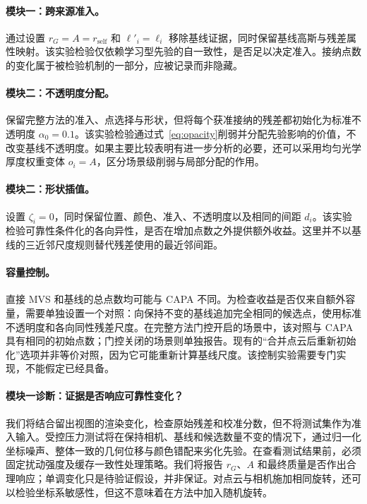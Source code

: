 \documentclass{article}
\newcommand{\ours}{CAPA}
\newcommand{\rself}{r_{\mathrm{self}}}
\begin{document}
\paragraph{模块一：跨来源准入。}
通过设置 $r_G=A=\rself$ 和 $\ell'_i=\ell_i$ 移除基线证据，同时保留基线高斯与残差属性映射。该实验检验仅依赖学习型先验的自一致性，是否足以决定准入。接纳点数的变化属于被检验机制的一部分，应被记录而非隐藏。

\paragraph{模块二：不透明度分配。}
保留完整方法的准入、点选择与形状，但将每个获准接纳的残差都初始化为标准不透明度 $\alpha_0=0.1$。该实验检验通过式~\eqref{eq:opacity}削弱并分配先验影响的价值，不改变基线不透明度。如果主要比较表明有进一步分析的必要，还可以采用均匀光学厚度权重变体 $o_i=A$，区分场景级削弱与局部分配的作用。

\paragraph{模块二：形状插值。}
设置 $\zeta_i=0$，同时保留位置、颜色、准入、不透明度以及相同的间距 $d_i$。该实验检验可靠性条件化的各向异性，是否在增加点数之外提供额外收益。这里并不以基线的三近邻尺度规则替代残差使用的最近邻间距。

\paragraph{容量控制。}
直接 MVS 和基线的总点数均可能与 \ours{} 不同。为检查收益是否仅来自额外容量，需要单独设置一个对照：向保持不变的基线追加完全相同的候选点，使用标准不透明度和各向同性残差尺度。在完整方法门控开启的场景中，该对照与 \ours{} 具有相同的初始点数；门控关闭的场景则单独报告。现有的“合并点云后重新初始化”选项并非等价对照，因为它可能重新计算基线尺度。该控制实验需要专门实现，不能假定已经具备。

\paragraph{模块一诊断：证据是否响应可靠性变化？}
我们将结合留出视图的渲染变化，检查原始残差和校准分数，但不将测试集作为准入输入。受控压力测试将在保持相机、基线和候选数量不变的情况下，通过归一化坐标噪声、整体一致的几何位移与颜色错配来劣化先验。在查看测试结果前，必须固定扰动强度及缓存一致性处理策略。我们将报告 $r_G$、$A$ 和最终质量是否作出合理响应；单调变化只是待验证假设，并非保证。对点云与相机施加相同旋转，还可以检验坐标系敏感性，但这不意味着在方法中加入随机旋转。
\end{document}
